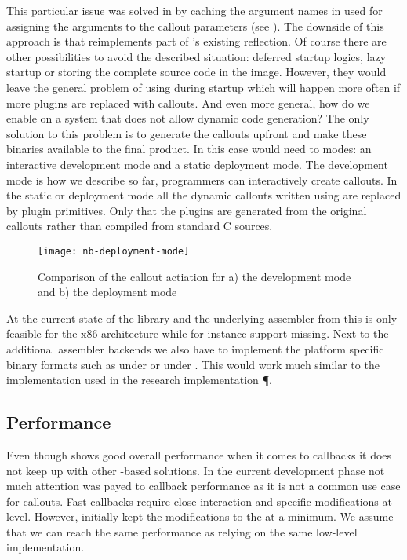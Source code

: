 This particular issue was solved in \PH by caching the argument names in \NB used for assigning the \PH arguments to the callout parameters (see ).
The downside of this approach is that \NB reimplements part of \PH's existing reflection.
Of course there are other possibilities to avoid the described situation: deferred startup logics, lazy startup or storing the complete \PH source code in the image.
However, they would leave the general problem of using \NB during startup which will happen more often if more \VM plugins are replaced with \FFI callouts.
And even more general, how do we enable \NB on a system that does not allow dynamic code generation?
The only solution to this problem is to generate the \FFI callouts upfront and make these binaries available to the final product.
In this case \NB would need to modes: an interactive development mode and a static deployment mode.
The development mode is how we describe \NB so far, programmers can interactively create callouts.
In the static or deployment mode all the dynamic callouts written using \NB are replaced by \PH plugin primitives.
Only that the plugins are generated from the original \NB callouts rather than compiled from standard C sources.
%
\begin{figure}[h]
\centering
\texttt{[image: nb-deployment-mode]}
\caption[\NB Deployment Mode]{Comparison of the callout actiation for a) the development mode and b) the deployment mode}
\end{figure}
%
At the current state of the \FFI library and the underlying assembler from \B this is only feasible for the x86 architecture while for instance \ARM support missing.
Next to the additional assembler backends we also have to implement the platform specific binary formats such as \ELF under \Linux or \MachO under \OSX.
This would work much similar to the implementation used in the research \ST implementation \P \cite{Verw12a}.

\subsection{Performance}
Even though \NB shows good overall performance when it comes to callbacks it does not keep up with other \ST-based solutions.
In the current development phase not much attention was payed to callback performance as it is not a common use case for \FFI callouts.
Fast callbacks require close interaction and specific modifications at \VM-level.
However, initially \NB kept the modifications to the \VM at a minimum.
We assume that we can reach the same performance as \Alien relying on the same low-level implementation.

